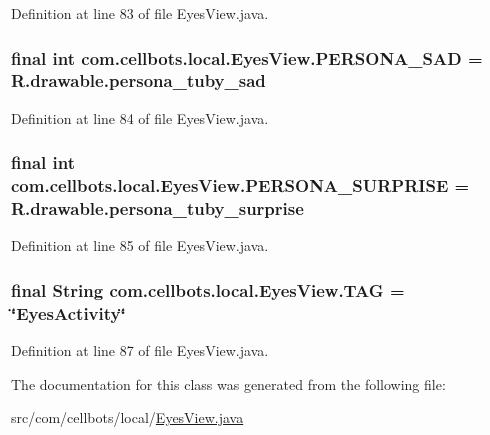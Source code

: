 Definition at line 83 of file Eyes\-View.\-java.

\hypertarget{classcom_1_1cellbots_1_1local_1_1_eyes_view_aded5fba0c87a65488adc6045477c943c}{
\subsubsection[{P\-E\-R\-S\-O\-N\-A\-\_\-\-S\-A\-D}]{\setlength{\rightskip}{0pt plus 5cm}final int {\bf com.\-cellbots.\-local.\-Eyes\-View.\-P\-E\-R\-S\-O\-N\-A\-\_\-\-S\-A\-D} = R.\-drawable.\-persona\-\_\-tuby\-\_\-sad}}\label{classcom_1_1cellbots_1_1local_1_1_eyes_view_aded5fba0c87a65488adc6045477c943c}


Definition at line 84 of file Eyes\-View.\-java.

\hypertarget{classcom_1_1cellbots_1_1local_1_1_eyes_view_a1c8c5bf7328878c12c464030465686a4}{
\subsubsection[{P\-E\-R\-S\-O\-N\-A\-\_\-\-S\-U\-R\-P\-R\-I\-S\-E}]{\setlength{\rightskip}{0pt plus 5cm}final int {\bf com.\-cellbots.\-local.\-Eyes\-View.\-P\-E\-R\-S\-O\-N\-A\-\_\-\-S\-U\-R\-P\-R\-I\-S\-E} = R.\-drawable.\-persona\-\_\-tuby\-\_\-surprise}}\label{classcom_1_1cellbots_1_1local_1_1_eyes_view_a1c8c5bf7328878c12c464030465686a4}


Definition at line 85 of file Eyes\-View.\-java.

\hypertarget{classcom_1_1cellbots_1_1local_1_1_eyes_view_ae8564614b3a622836ca68f64cf33108c}{
\subsubsection[{T\-A\-G}]{\setlength{\rightskip}{0pt plus 5cm}final String {\bf com.\-cellbots.\-local.\-Eyes\-View.\-T\-A\-G} = \char`\"{}Eyes\-Activity\char`\"{}}}\label{classcom_1_1cellbots_1_1local_1_1_eyes_view_ae8564614b3a622836ca68f64cf33108c}


Definition at line 87 of file Eyes\-View.\-java.



The documentation for this class was generated from the following file\-:\begin{DoxyCompactItemize}
\item 
src/com/cellbots/local/\hyperlink{_eyes_view_8java}{Eyes\-View.\-java}\end{DoxyCompactItemize}
